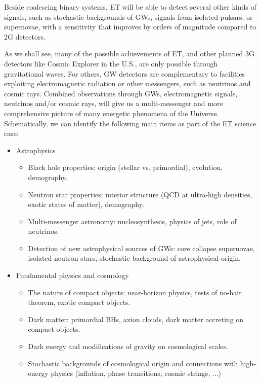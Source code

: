 Beside coalescing binary systems, ET will be able to detect several other kinds of signals, such as stochastic backgrounds of GWs, signals from isolated pulsars, or supernovae, with a sensitivity that improves by orders of magnitude compared to 2G detectors.

As we shall see, many of the possible achievements of ET, and other planned 3G detectors like Cosmic Explorer in the U.S., are only possible through gravitational waves. For others, GW detectors are complementary to  facilities exploiting electromagnetic radiation  or other messengers, such as neutrinos and cosmic rays. Combined observations through GWs, electromagnetic signals, neutrinos and/or cosmic rays, will give us a multi-messenger and more comprehensive picture of many energetic phenomena of the Universe.
Schematically, we can identify the following main items as part of the ET science case:

\vspace{2mm}

\begin{itemize}
\item Astrophysics 
  \begin{itemize}
   \item Black hole properties: origin (stellar vs. primordial), evolution, demography.
   \item Neutron star properties: interior structure (QCD at ultra-high densities, exotic states of matter), demography.
   \item Multi-messenger astronomy: nucleosynthesis, physics of jets, %
role of neutrinos.
   \item Detection of new astrophysical sources of GWs: core collapse supernovae, isolated neutron stars, stochastic background of astrophysical origin.
  \end{itemize}
\item Fundamental physics and cosmology
  \begin{itemize}
   \item The  nature of compact objects: near-horizon physics, tests of no-hair theorem, exotic compact objects.
  \item Dark matter: primordial BHs, axion clouds, dark matter accreting on compact objects.
  \item Dark energy and modifications of  gravity on cosmological scales.
   \item Stochastic backgrounds of cosmological origin and connections with high-energy physics (inflation, phase transitions, cosmic strings, ...)
  \end{itemize}
\end{itemize}



